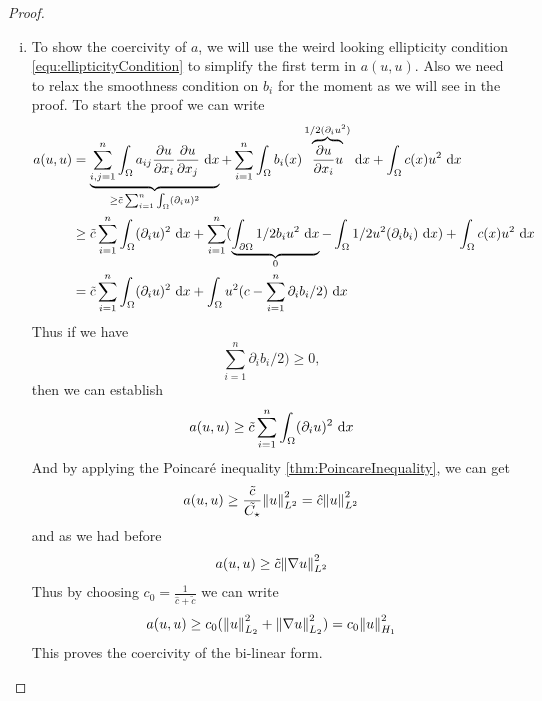 \begin{proof}
\begin{enumerate}[(i)]
\begin{align*}
{				+ \norm{u}_{L_2}\norm{v}_{L_2} 
			}\\
			&\leq \hat{c}\Par{\norm{v}_{L_2} + \sum_{j=1}^{n}\norm{\partial_j v}_{L_2}}
			\Par{\norm{u}_{L_2} + \sum_{i=1}^{n}\norm{\partial_i u}_{L_2}}\\
			&{\color{red} \boxed{\leq}}\ 2n\hat{c}\Par{\norm{v}_{L_2}^2 + \sum_{j=1}^{n}\norm{\partial_j v}_{L_2}^2}^{1/2}
			\Par{\norm{u}_{L_2}^2 + \sum_{i=1}^{n}\norm{\partial_i u}_{L_2}^2}^{1/2}\\
			&\leq c \norm{v}_{H_1} \norm{u}_{H_1}.
		\end{align*}
		Note that in the argument above, I have highlighted the last inequality as red. That is because I don't know how this step works. This proof is provided at \hyperlink{https://people.maths.ox.ac.uk/suli/fem.pdf}{FEM lecture notes}, and is called a ``further majorization''.
		
		\item To show the coercivity of $ a $, we will use the weird looking ellipticity condition \autoref{equ:ellipticityCondition} to simplify the first term in $ a(u,u) $. Also we need to relax the smoothness condition on $ b_i $ for the moment as we will see in the proof. To start the proof we can write
		\begin{align*}
			a(u,u) &= \underbrace{\sum_{i,j=1}^{n}\int_\Omega a_{ij}\frac{\partial u}{\partial x_i} \frac{\partial u}{\partial x_j}\dx}_{\geq \tilde{c}\sum_{i=1}^{n}\int_\Omega (\partial_i u)^2} 
			+\sum_{i=1}^{n} \int_\Omega b_i(x) \overbrace{\frac{\partial u}{\partial x_i} u}^{1/2(\partial_i u^2)} \dx + \int_\Omega c(x) {u}^2 \dx\\
			&\geq \tilde{c}\sum_{i=1}^{n}\int_\Omega (\partial_i u)^2 \dx + \sum_{i=1}^{n}(\underbrace{\int_{\partial \Omega} 1/2 b_i u^2 \dx}_{0} 
				- \int_\Omega 1/2u^2(\partial_i b_i )\dx) 
			+ \int_\Omega c(x) {u}^2 \dx \\
			&= \tilde{c}\sum_{i=1}^{n}\int_\Omega (\partial_i u)^2 \dx 
			+ \int_\Omega u^2 (c-\sum_{i=1}^{n}\partial_i b_i/2) \dx
		\end{align*}
		Thus if we have
		\[ \sum_{i=1}^{n}\partial_i b_i/2) \geq 0, \]
		then we can establish
		\[ a(u,u) \geq \tilde{c}\sum_{i=1}^{n}\int_\Omega (\partial_i u)^2 \, \operatorname{d}\!x   \]
		And by applying the Poincar\'{e} inequality \autoref{thm:PoincareInequality}, we can get
		\[ a(u,u) \geq \frac{\tilde{c}}{\tilde{C_\star}} \norm{u}_{L^2}^2 = \hat{c} \norm{u}_{L^2}^2 \]
		and as we had before
		\[ a(u,u) \geq \tilde{c}\norm{\nabla u }_{L^2}^2 \]
		Thus by choosing $ c_0 = \frac{1}{\hat{c} + \tilde{c}} $ we can write 
		\[a(u,u) \geq c_0 (\norm{u}^2_{L_2} + \norm{\nabla u}^2_{L_2}) = c_0 \norm{u}_{H_1}^2 \]
		This proves the coercivity of the bi-linear form.
		

\end{enumerate}
\end{proof}
